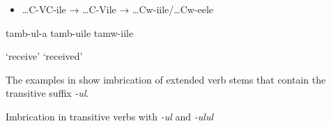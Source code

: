 \documentclass[output=paper]{langsci/langscibook}
\begin{document}
\begin{itemize}
\item \begin{stylelsLanginfo}
…C-VC-ile  →  …C-Vile  →  …Cw-iile/…Cw-eele
\end{stylelsLanginfo}\end{itemize}
\begin{stylelsSourceline}
  tamb-ul-a        tamb-uile    tamw-iile
\end{stylelsSourceline}

\begin{stylelsTranslation}
‘receive’          ‘received’
\end{stylelsTranslation}

The examples in  show imbrication of extended verb stems that contain the transitive suffix \textit{{}-}\emph{ul}.

\begin{table}
\caption{Imbrication in transitive verbs with \textit{{}-}\emph{ul} and \textit{{}-}\emph{ulul}}
\label{tab:23}
\end{table}
\end{document}
